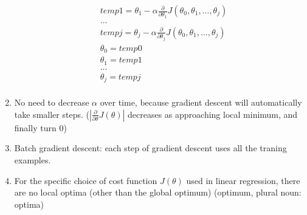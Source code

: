 \documentclass[UTF8]{ctexart}
\begin{document}
\begin{enumerate}
\[\begin{aligned}
                   & temp1 = \theta_1 - \alpha \frac{\partial}{\partial\theta_1} J(\theta_0, \theta_1, \ldots, \theta_j) \\
                   & \ldots                                                                                              \\
                   & tempj = \theta_j - \alpha \frac{\partial}{\partial\theta_j} J(\theta_0, \theta_1, \ldots, \theta_j) \\
                   & \theta_0 = temp0                                                                                    \\
                   & \theta_1 = temp1                                                                                    \\
                   & \ldots                                                                                              \\
                   & \theta_j = tempj                                                                                    \\
              \end{aligned}
          \]
    \item No need to decrease $\alpha$ over time, because gradient descent will automatically take smaller steps. ($|\frac{\partial}{\partial\theta}J(\theta)|$ decreases as approaching local minimum, and finally turn $0$)
    \item Batch gradient descent: each step of gradient descent uses all the traning examples.
    \item For the specific choice of cost function $J(\theta)$ used in linear regression, there are no local optima (other than the global optimum) (optimum, plural noun: optima)
\end{enumerate}
\end{document}
